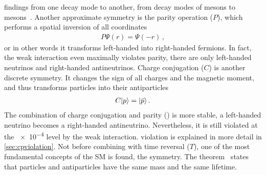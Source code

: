 findings from one decay mode to another, \eg from decay modes of \Bd mesons to
\Bs mesons~\cite{Uspin1,Uspin2}. Another approximate symmetry is the parity
operation ($P$), which performs a spatial inversion of all coordinates
\begin{align}
	P\Psi(r) = \Psi(-r)\,,
\end{align}
or in other words it transforms left-handed into right-handed fermions. In
fact, the weak interaction even maximally violates parity, \eg there are only
left-handed neutrinos and right-handed antineutrinos. Charge conjugation ($C$)
is another discrete symmetry. It changes the sign of all charges and the
magnetic moment, and thus transforms particles into their antiparticles
\begin{align}
	C |p\rangle = |\bar p\rangle\,.
\end{align}
The combination of charge conjugation and parity (\CP) is more stable,
\eg a left-handed neutrino becomes a right-handed antineutrino. Nevertheless,
it is still violated at the \num{e-4} level by the weak interaction. \CP
violation is explained in more detail in \cref{sec:cpviolation}. Not before
combining \CP with time reversal ($T$), one of the most fundamental concepts
of the SM is found, the \CPT symmetry. The \CPT
theorem~\cite{Schwinger:1951xk,Luders:1954zz,pauli1955niels} states that
particles and antiparticles have the same mass and the same lifetime.
